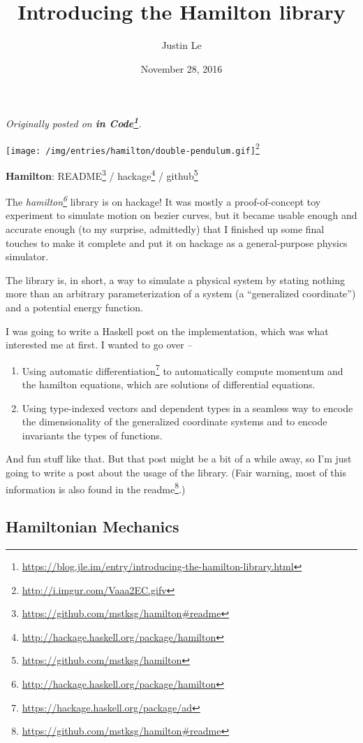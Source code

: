 \documentclass[]{article}
\title{Introducing the Hamilton library}
\author{Justin Le}
\date{November 28, 2016}
\renewcommand{\href}[2]{#2\footnote{\url{#1}}}
\begin{document}
\maketitle

\emph{Originally posted on
\textbf{\href{https://blog.jle.im/entry/introducing-the-hamilton-library.html}{in
Code}}.}

\href{http://i.imgur.com/Vaaa2EC.gifv}{\texttt{[image: /img/entries/hamilton/double-pendulum.gif]}}

\textbf{Hamilton}: \href{https://github.com/mstksg/hamilton\#readme}{README} /
\href{http://hackage.haskell.org/package/hamilton}{hackage} /
\href{https://github.com/mstksg/hamilton}{github}

The \emph{\href{http://hackage.haskell.org/package/hamilton}{hamilton}} library
is on hackage! It was mostly a proof-of-concept toy experiment to simulate
motion on bezier curves, but it became usable enough and accurate enough (to my
surprise, admittedly) that I finished up some final touches to make it complete
and put it on hackage as a general-purpose physics simulator.

The library is, in short, a way to simulate a physical system by stating nothing
more than an arbitrary parameterization of a system (a ``generalized
coordinate'') and a potential energy function.

I was going to write a Haskell post on the implementation, which was what
interested me at first. I wanted to go over --

\begin{enumerate}
\def\labelenumi{\arabic{enumi}.}
\item
  Using \href{https://hackage.haskell.org/package/ad}{automatic differentiation}
  to automatically compute momentum and the hamilton equations, which are
  solutions of differential equations.
\item
  Using type-indexed vectors and dependent types in a seamless way to encode the
  dimensionality of the generalized coordinate systems and to encode invariants
  the types of functions.
\end{enumerate}

And fun stuff like that. But that post might be a bit of a while away, so I'm
just going to write a post about the usage of the library. (Fair warning, most
of this information is also found in the
\href{https://github.com/mstksg/hamilton\#readme}{readme}.)

\subsection{Hamiltonian Mechanics}\label{hamiltonian-mechanics}
\end{document}
